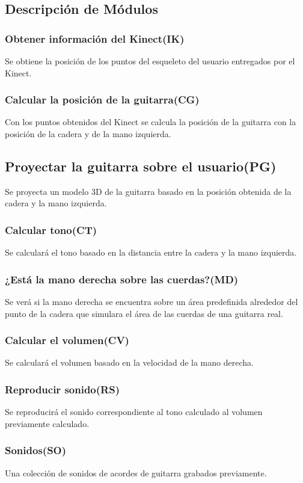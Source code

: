 \documentclass[a4paper,12pt]{article}
\begin{document}
\subsection{Descripción de Módulos}
\subsubsection{Obtener información del Kinect(IK)}
Se obtiene la posición de los puntos del esqueleto del usuario entregados por el
Kinect.
\subsubsection{Calcular la posición de la guitarra(CG)}
Con los puntos obtenidos del Kinect se calcula la posición de la guitarra con la
posición de la cadera y de la mano izquierda.
\subsection{Proyectar la guitarra sobre el usuario(PG)}
Se proyecta un modelo 3D de la guitarra basado en la posición obtenida de la
cadera y la mano izquierda.
\subsubsection{Calcular tono(CT)}
Se calculará el tono basado en la distancia entre la cadera y la mano izquierda.
\subsubsection{¿Está la mano derecha sobre las cuerdas?(MD)}
Se verá si la mano derecha se encuentra sobre un área predefinida alrededor del
punto de la cadera que simulara el área de las cuerdas de una guitarra real.
\subsubsection{Calcular el volumen(CV)}
Se calculará el volumen basado en la velocidad de la mano derecha.
\subsubsection{Reproducir sonido(RS)}
Se reproducirá el sonido correspondiente al tono calculado al volumen
previamente calculado.
\subsubsection{Sonidos(SO)}
Una colección de sonidos de acordes de guitarra grabados previamente.
\end{document}
